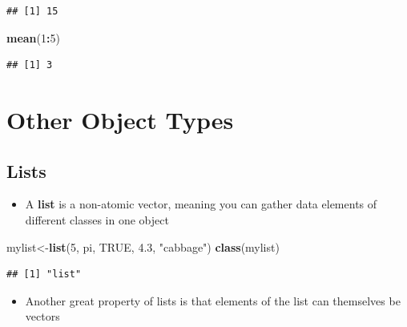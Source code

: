 \documentclass[]{book}
\newenvironment{Shaded}{\begin{snugshade}}{\end{snugshade}}
\newcommand{\KeywordTok}[1]{\textcolor[rgb]{0.13,0.29,0.53}{\textbf{#1}}}
\newcommand{\DecValTok}[1]{\textcolor[rgb]{0.00,0.00,0.81}{#1}}
\newcommand{\FloatTok}[1]{\textcolor[rgb]{0.00,0.00,0.81}{#1}}
\newcommand{\StringTok}[1]{\textcolor[rgb]{0.31,0.60,0.02}{#1}}
\newcommand{\OtherTok}[1]{\textcolor[rgb]{0.56,0.35,0.01}{#1}}
\newcommand{\OperatorTok}[1]{\textcolor[rgb]{0.81,0.36,0.00}{\textbf{#1}}}
\newcommand{\NormalTok}[1]{#1}
\providecommand{\tightlist}{%
  \setlength{\itemsep}{0pt}\setlength{\parskip}{0pt}}
\theoremstyle{definition}
\theoremstyle{definition}
\theoremstyle{definition}
\theoremstyle{remark}
\begin{document}
\begin{verbatim}
## [1] 15
\end{verbatim}

\begin{Shaded}
\begin{Highlighting}[]
\KeywordTok{mean}\NormalTok{(}\DecValTok{1}\OperatorTok{:}\DecValTok{5}\NormalTok{)}
\end{Highlighting}
\end{Shaded}

\begin{verbatim}
## [1] 3
\end{verbatim}

\section{Other Object Types}\label{other-object-types}

\subsection{Lists}\label{lists}

\begin{itemize}
\tightlist
\item
  A \textbf{list} is a non-atomic vector, meaning you can gather data
  elements of different classes in one object
\end{itemize}

\begin{Shaded}
\begin{Highlighting}[]
\NormalTok{mylist<-}\KeywordTok{list}\NormalTok{(}\DecValTok{5}\NormalTok{, pi, }\OtherTok{TRUE}\NormalTok{, }\FloatTok{4.3}\NormalTok{, }\StringTok{"cabbage"}\NormalTok{)}
\KeywordTok{class}\NormalTok{(mylist)}
\end{Highlighting}
\end{Shaded}

\begin{verbatim}
## [1] "list"
\end{verbatim}

\begin{itemize}
\tightlist
\item
  Another great property of lists is that elements of the list can
  themselves be vectors
\end{itemize}
\end{document}
